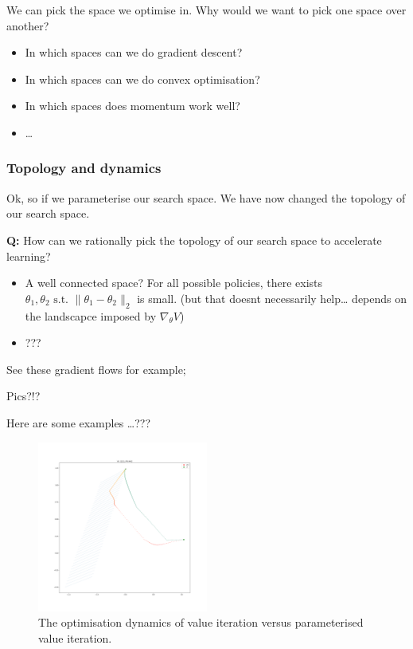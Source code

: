 We can pick the space we optimise in. Why would we want to pick one
space over another?

\begin{itemize}
\item
  In which spaces can we do gradient descent?
\item
  In which spaces can we do convex optimisation?
\item
  In which spaces does momentum work well?
\item
  \ldots{}
\end{itemize}

\subsubsection{Topology and dynamics}

Ok, so if we parameterise our search space. We have now changed the
topology of our search space.

\textbf{Q:} How can we rationally pick the topology of our search space
to accelerate learning?

\begin{itemize}
\item
  A well connected space? For all possible policies, there exists
  \(\theta_1, \theta_2 \text{ s.t. } \parallel \theta_1- \theta_2\parallel_2\)
  is small. (but that doesnt necessarily help\ldots{} depends on the
  landscapce imposed by \(\nabla_{\theta} V\))
\item
  ???
\end{itemize}

See these gradient flows for example;

Pics?!?

Here are some examples \ldots{}???

\begin{figure}
\centering
\includegraphics[width=0.5\textwidth,height=0.5\textheight]{../../pictures/figures/vi-vs-pvi.png}
\caption{The optimisation dynamics of value iteration versus
parameterised value iteration.}
\end{figure}

